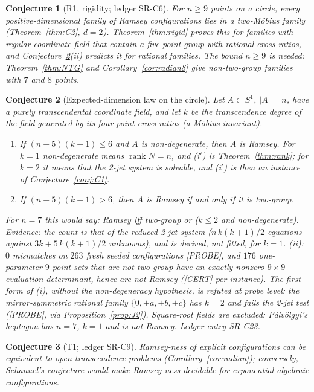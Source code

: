 \documentclass[11pt]{amsart}
\newcommand{\st}[1]{\textsf{[#1]}}
\theoremstyle{plain}
\newtheorem{conjecture}{Conjecture}
\theoremstyle{definition}
\begin{document}
\begin{conjecture}[R1, rigidity; ledger SR-C6]\label{conj:R1}
For $n\ge9$ points on a circle, every positive-dimensional family of Ramsey configurations lies in a
two-M\"obius family (Theorem~\ref{thm:C2}, $d=2$). Theorem~\ref{thm:rigid} proves this for families
with regular coordinate field that contain a five-point group with rational cross-ratios, and
Conjecture~\ref{conj:count}(ii) predicts it for rational families. The bound $n\ge9$ is needed:
Theorem~\ref{thm:NTG} and Corollary~\ref{cor:radian8} give non-two-group families with $7$ and $8$ points.
\end{conjecture}

\begin{conjecture}[Expected-dimension law on the circle]\label{conj:count}
Let $A\subset S^1$, $|A|=n$, have a purely transcendental coordinate field, and let $k$ be the transcendence
degree of the field generated by its four-point cross-ratios (a M\"obius invariant).
\begin{enumerate}
\item[(i$'$)] If $(n-5)(k+1)\le6$ and $A$ is non-degenerate, then $A$ is Ramsey. For $k=1$ non-degenerate
means $\operatorname{rank}N=n$, and (i$'$) is Theorem~\ref{thm:rank}; for $k=2$ it means that the 2-jet system is
solvable, and (i$'$) is then an instance of Conjecture~\ref{conj:C1}.
\item[(ii)] If $(n-5)(k+1)>6$, then $A$ is Ramsey if and only if it is two-group.
\end{enumerate}
For $n=7$ this would say: Ramsey iff two-group or ($k\le2$ and non-degenerate). Evidence: the count is that of
the reduced 2-jet system ($n\,k(k+1)/2$ equations against $3k+5\,k(k+1)/2$ unknowns), and is derived, not
fitted, for $k=1$. (ii): $0$ mismatches on $263$ fresh seeded configurations \st{PROBE}, and $176$
one-parameter $9$-point sets that are not two-group have an exactly nonzero $9\times9$ evaluation determinant,
hence are not Ramsey (\st{CERT} per instance). The first form of (i), without the non-degeneracy hypothesis,
is refuted at probe level: the mirror-symmetric rational family $\{0,\pm a,\pm b,\pm c\}$ has $k=2$ and fails
the 2-jet test (\st{PROBE}, via Proposition~\ref{prop:J2}). Square-root fields are excluded: P\'alv\"olgyi's
heptagon has $n=7$, $k=1$ and is not Ramsey. Ledger entry SR-C23.
\end{conjecture}

\begin{conjecture}[T1; ledger SR-C9]\label{conj:T1}
Ramsey-ness of explicit configurations can be equivalent to open transcendence problems
(Corollary~\ref{cor:radian}); conversely, Schanuel's conjecture would make Ramsey-ness decidable for
exponential-algebraic configurations.
\end{conjecture}
\end{document}
